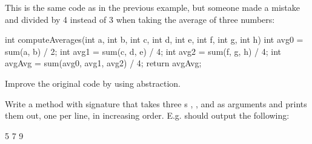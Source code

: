 \begin{exercise}
This is the same code as in the previous example, but
someone made a mistake and divided by 4 instead of 3
when taking the average of three numbers:
\begin{code}
int computeAverages(int a, int b, int c, int d, int e, int f, int g, int h) {
  int avg0 = sum(a, b) / 2;
  int avg1 = sum(c, d, e) / 4;
  int avg2 = sum(f, g, h) / 4;
  int avgAvg = sum(avg0, avg1, avg2) / 4;
  return avgAvg;
}
\end{code}
Improve the original code by using abstraction.
\end{exercise}

\begin{exercise}
Write a method with signature  that takes
three s , , and  as arguments and prints them out,
one per line, in increasing order. E.g.  should output the following:
\begin{code}
5
7
9
\end{code}
\end{exercise}

